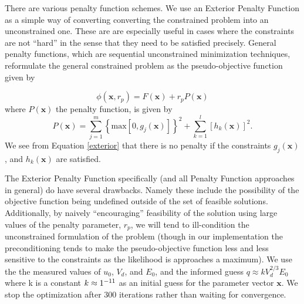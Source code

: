 \documentclass[12pt,a4paper,oneside]{book}
\begin{document}
There are various penalty function schemes. We use an Exterior Penalty Function as a simple way of converting converting the constrained problem into an unconstrained one. These are are especially useful in cases where the constraints are not ``hard'' in the sense that they need to be satisfied precisely. General penalty functions, which are sequential unconstrained minimization techniques, reformulate the general constrained problem as the pseudo-objective function given by

\[ \phi(\mathbf{x}, r_p ) = F(\mathbf{x}) + r_p P(\mathbf{x}) \]
where $P \left( \mathbf{x} \right)$ the penalty function, is given by
\begin{equation} \label{exterior}
 P( \mathbf{x} ) = \sum_{j = 1}^m \left\lbrace \mbox{max} \left[ 0, g_j(\mathbf{x} ) \right] \right\rbrace^2 + 
\sum_{k = 1}^l \left[ h_k( \mathbf{x}) \right]^2 .
\end{equation}
We see from Equation \ref{exterior} that there is no penalty if the constraints $g_j(\mathbf{x})$, and $h_k(\mathbf{x})$ are satisfied.
 
The Exterior Penalty Function specifically (and all Penalty Function approaches in general) do have several drawbacks. Namely these include the possibility of the objective function being undefined outside of the set of feasible solutions. Additionally, by naively ``encouraging'' feasibility of the solution using large values of the penalty parameter, $r_p$, we will tend to ill-condition the unconstrained formulation of the problem (though in our implementation the preconditioning tends to make the pseudo-objective function less and less sensitive to the constraints as the likelihood is approaches a maximum). We use the the measured values of $u_0$, $V_d$, and $E_0$, and the informed guess $q \approx k V_d^{2/3} E_0$ where k is a constant $k \approx 1 \time 10^{-11}$ as an initial guess for the parameter vector $\mathbf{x}$. We stop the optimization after 300 iterations rather than waiting for convergence.
\end{document}
